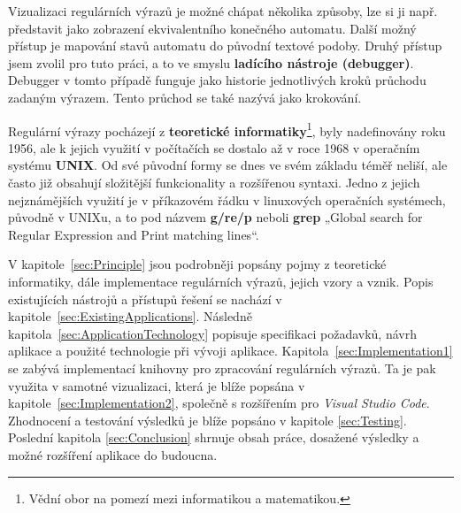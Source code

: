 Vizualizaci regulárních výrazů je možné chápat několika způsoby, lze si ji např. představit jako zobrazení ekvivalentního konečného automatu.
Další možný přístup je mapování stavů automatu do původní textové podoby. 
Druhý přístup jsem zvolil pro tuto práci, a to ve smyslu \textbf{ladícího nástroje (debugger)}. 
Debugger v tomto případě funguje jako historie jednotlivých kroků průchodu zadaným výrazem. 
Tento průchod se také nazývá jako krokování.

Regulární výrazy pocházejí z \textbf{teoretické informatiky}\footnote{Vědní obor na pomezí mezi informatikou a matematikou.}, byly nadefinovány roku 1956, ale k jejich využití v počítačích se dostalo až v roce 1968 v operačním systému \textbf{UNIX}.
Od své původní formy se dnes ve svém základu téměř neliší, ale často již obsahují složitější funkcionality a rozšířenou syntaxi.
Jedno z jejich nejznámějších využití je v příkazovém řádku v linuxových operačních systémech, původně v UNIXu, a to pod názvem \textbf{g/re/p} neboli \textbf{grep} 
„Global search for Regular Expression and Print matching lines“\cite{Aho_Ullman_1992}. 

V kapitole~\ref{sec:Principle} jsou podrobněji popsány pojmy z teoretické informatiky, dále implementace regulárních výrazů, jejich vzory a vznik.
Popis existujících nástrojů a přístupů řešení se nachází v kapitole~\ref{sec:ExistingApplications}.
Následně kapitola~\ref{sec:ApplicationTechnology} popisuje specifikaci požadavků, návrh aplikace a použité technologie při vývoji aplikace.
Kapitola~\ref{sec:Implementation1} se zabývá implementací knihovny pro zpracování regulárních výrazů. 
Ta je pak využita v samotné vizualizaci, která je blíže popsána v kapitole~\ref{sec:Implementation2}, společně s rozšířením pro \textit{Visual Studio Code}.
Zhodnocení a testování výsledků je blíže popsáno v kapitole \ref{sec:Testing}.
Poslední kapitola \ref{sec:Conclusion} shrnuje obsah práce, dosažené výsledky a možné rozšíření aplikace do budoucna. 

\endinput